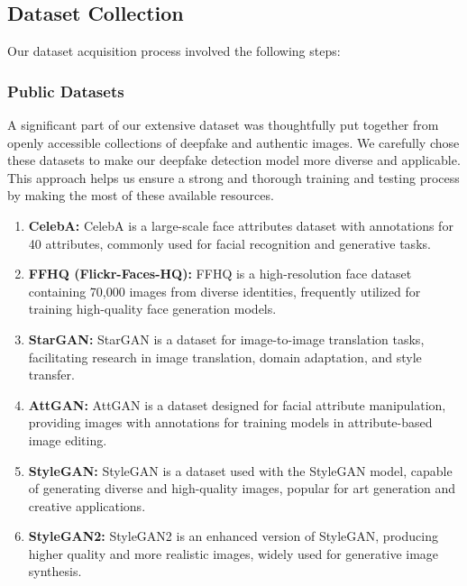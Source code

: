 \subsection{Dataset Collection}

\noindent Our dataset acquisition process involved the following steps:


\subsubsection{Public Datasets}
A significant part of our extensive dataset was thoughtfully put together from openly accessible collections of deepfake and authentic images. We carefully chose these datasets to make our deepfake detection model more diverse and applicable. This approach helps us ensure a strong and thorough training and testing process by making the most of these available resources.


\begin{enumerate}
\item \textbf{CelebA:} CelebA is a large-scale face attributes dataset with annotations for 40 attributes, commonly used for facial recognition and generative tasks.

\item \textbf{FFHQ (Flickr-Faces-HQ):} FFHQ is a high-resolution face dataset containing 70,000 images from diverse identities, frequently utilized for training high-quality face generation models.

\item \textbf{StarGAN:} StarGAN is a dataset for image-to-image translation tasks, facilitating research in image translation, domain adaptation, and style transfer.

\item \textbf{AttGAN:} AttGAN is a dataset designed for facial attribute manipulation, providing images with annotations for training models in attribute-based image editing.

\item \textbf{StyleGAN:} StyleGAN is a dataset used with the StyleGAN model, capable of generating diverse and high-quality images, popular for art generation and creative applications.

\item \textbf{StyleGAN2:} StyleGAN2 is an enhanced version of StyleGAN, producing higher quality and more realistic images, widely used for generative image synthesis.

\end{enumerate}


